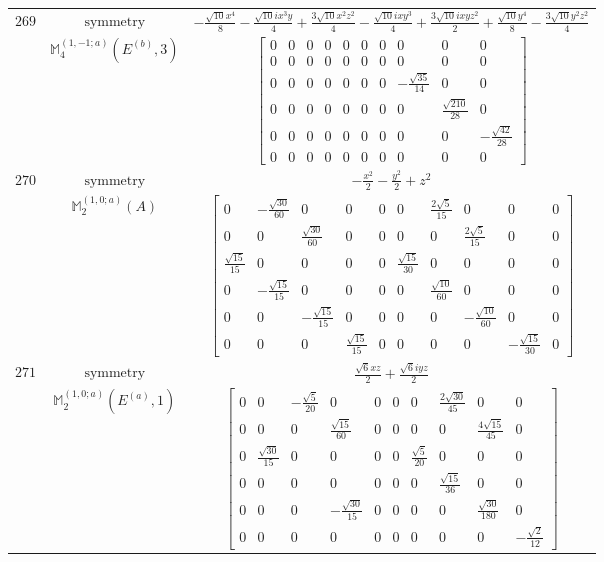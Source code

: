\documentclass[fleqn,8pt,landscape]{jsarticle}
\begin{document}
\begin{longtable}{ccc}
$ 269 $ & $ \text{symmetry} $ & $ - \frac{\sqrt{10} x^{4}}{8} - \frac{\sqrt{10} i x^{3} y}{4} + \frac{3 \sqrt{10} x^{2} z^{2}}{4} - \frac{\sqrt{10} i x y^{3}}{4} + \frac{3 \sqrt{10} i x y z^{2}}{2} + \frac{\sqrt{10} y^{4}}{8} - \frac{3 \sqrt{10} y^{2} z^{2}}{4} $ \\
$  $ & $ \mathbb{M}_{4}^{(1,-1;a)}(E^{(b)},3) $ & $ \begin{bmatrix} 0 & 0 & 0 & 0 & 0 & 0 & 0 & 0 & 0 & 0 \\ 0 & 0 & 0 & 0 & 0 & 0 & 0 & 0 & 0 & 0 \\ 0 & 0 & 0 & 0 & 0 & 0 & 0 & - \frac{\sqrt{35}}{14} & 0 & 0 \\ 0 & 0 & 0 & 0 & 0 & 0 & 0 & 0 & \frac{\sqrt{210}}{28} & 0 \\ 0 & 0 & 0 & 0 & 0 & 0 & 0 & 0 & 0 & - \frac{\sqrt{42}}{28} \\ 0 & 0 & 0 & 0 & 0 & 0 & 0 & 0 & 0 & 0 \end{bmatrix} $ \\ \hline
$ 270 $ & $ \text{symmetry} $ & $ - \frac{x^{2}}{2} - \frac{y^{2}}{2} + z^{2} $ \\
$  $ & $ \mathbb{M}_{2}^{(1,0;a)}(A) $ & $ \begin{bmatrix} 0 & - \frac{\sqrt{30}}{60} & 0 & 0 & 0 & 0 & \frac{2 \sqrt{5}}{15} & 0 & 0 & 0 \\ 0 & 0 & \frac{\sqrt{30}}{60} & 0 & 0 & 0 & 0 & \frac{2 \sqrt{5}}{15} & 0 & 0 \\ \frac{\sqrt{15}}{15} & 0 & 0 & 0 & 0 & \frac{\sqrt{15}}{30} & 0 & 0 & 0 & 0 \\ 0 & - \frac{\sqrt{15}}{15} & 0 & 0 & 0 & 0 & \frac{\sqrt{10}}{60} & 0 & 0 & 0 \\ 0 & 0 & - \frac{\sqrt{15}}{15} & 0 & 0 & 0 & 0 & - \frac{\sqrt{10}}{60} & 0 & 0 \\ 0 & 0 & 0 & \frac{\sqrt{15}}{15} & 0 & 0 & 0 & 0 & - \frac{\sqrt{15}}{30} & 0 \end{bmatrix} $ \\ \hline
$ 271 $ & $ \text{symmetry} $ & $ \frac{\sqrt{6} x z}{2} + \frac{\sqrt{6} i y z}{2} $ \\
$  $ & $ \mathbb{M}_{2}^{(1,0;a)}(E^{(a)},1) $ & $ \begin{bmatrix} 0 & 0 & - \frac{\sqrt{5}}{20} & 0 & 0 & 0 & 0 & \frac{2 \sqrt{30}}{45} & 0 & 0 \\ 0 & 0 & 0 & \frac{\sqrt{15}}{60} & 0 & 0 & 0 & 0 & \frac{4 \sqrt{15}}{45} & 0 \\ 0 & \frac{\sqrt{30}}{15} & 0 & 0 & 0 & 0 & \frac{\sqrt{5}}{20} & 0 & 0 & 0 \\ 0 & 0 & 0 & 0 & 0 & 0 & 0 & \frac{\sqrt{15}}{36} & 0 & 0 \\ 0 & 0 & 0 & - \frac{\sqrt{30}}{15} & 0 & 0 & 0 & 0 & \frac{\sqrt{30}}{180} & 0 \\ 0 & 0 & 0 & 0 & 0 & 0 & 0 & 0 & 0 & - \frac{\sqrt{2}}{12} \end{bmatrix} $ \\ \hline

\end{longtable}
\end{document}
